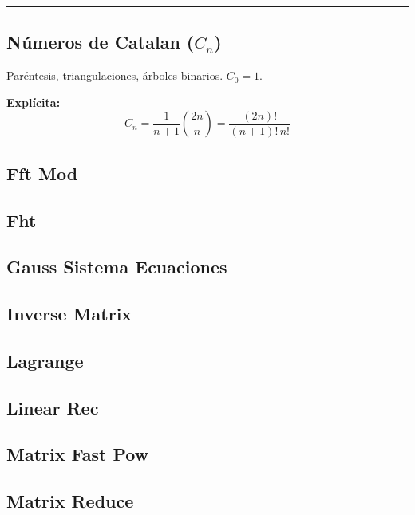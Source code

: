\documentclass[9pt,portrait,twocolumn,a4paper,notitlepage]{article}
\newcommand\cppfile[2][]{%
\ifstrempty{#1}{}{}%
}
\begin{document}
\rule{\linewidth}{0.2pt}

\subsection*{Números de Catalan ($C_n$)}
Paréntesis, triangulaciones, árboles binarios. $C_0=1$.

\textbf{Explícita:}
$$ C_n = \frac{1}{n+1} \binom{2n}{n} = \frac{(2n)!}{(n+1)!\,n!} $$



\subsection{Fft Mod}
\cppfile{math_clean/fft_mod.cpp}

\subsection{Fht}
\cppfile{math_clean/fht.cpp}

\subsection{Gauss Sistema Ecuaciones}
\cppfile{math_clean/gauss_sistema_ecuaciones.cpp}

\subsection{Inverse Matrix}
\cppfile{math_clean/inverse_matrix.cpp}

\subsection{Lagrange}
\cppfile{math_clean/lagrange.cpp}

\subsection{Linear Rec}
\cppfile{math_clean/linear_rec.cpp}

\subsection{Matrix Fast Pow}
\cppfile{math_clean/matrix_fast_pow.cpp}

\subsection{Matrix Reduce}
\cppfile{math_clean/matrix_reduce.cpp}
\end{document}
